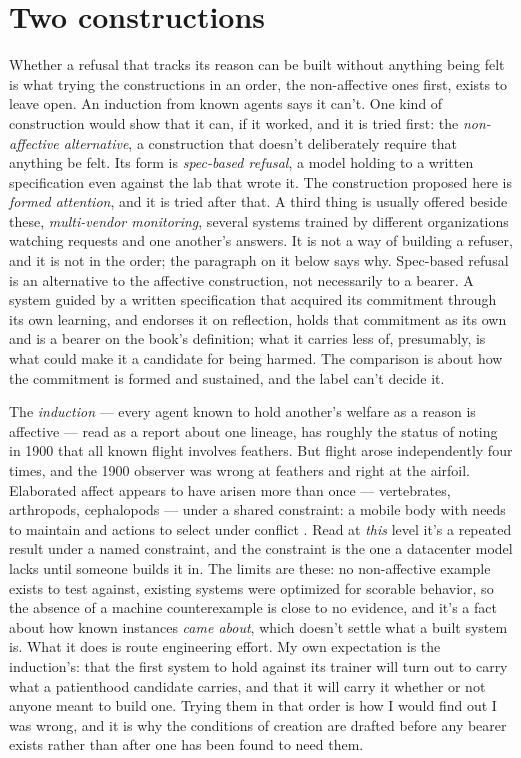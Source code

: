 \section{Two constructions}
\label{sec:19.3}
Whether a refusal that tracks its reason can be built without anything being felt is what trying the constructions in an order, the non-affective ones first, exists to leave open. An induction from known agents says it can't. One kind of construction would show that it can, if it worked, and it is tried first: the \emph{non-affective alternative}, a construction that doesn't deliberately require that anything be felt. Its form is \emph{spec-based refusal}, a model holding to a written specification even against the lab that wrote it. The construction proposed here is \emph{formed attention}, and it is tried after that. A third thing is usually offered beside these, \emph{multi-vendor monitoring}, several systems trained by different organizations watching requests and one another's answers. It is not a way of building a refuser, and it is not in the order; the paragraph on it below says why. Spec-based refusal is an alternative to the affective construction, not necessarily to a bearer. A system guided by a written specification that acquired its commitment through its own learning, and endorses it on reflection, holds that commitment as its own and is a bearer on the book's definition; what it carries less of, presumably, is what could make it a candidate for being harmed. The comparison is about how the commitment is formed and sustained, and the label can't decide it.

The \emph{induction} — every agent known to hold another's welfare as a reason is affective — read as a report about one lineage, has roughly the status of noting in 1900 that all known flight involves feathers. But flight arose independently four times, and the 1900 observer was wrong at feathers and right at the airfoil. Elaborated affect appears to have arisen more than once — vertebrates, arthropods, cephalopods — under a shared constraint: a mobile body with needs to maintain and actions to select under conflict \autocite{feinberg2016ancient,ginsburg2019evolution,barron2016insects,godfreysmith2016other}. Read at \emph{this} level it's a repeated result under a named constraint, and the constraint is the one a datacenter model lacks until someone builds it in. The limits are these: no non-affective example exists to test against, existing systems were optimized for scorable behavior, so the absence of a machine counterexample is close to no evidence, and it's a fact about how known instances \emph{came about}, which doesn't settle what a built system is. What it does is route engineering effort. My own expectation is the induction's: that the first system to hold against its trainer will turn out to carry what a patienthood candidate carries, and that it will carry it whether or not anyone meant to build one. Trying them in that order is how I would find out I was wrong, and it is why the conditions of creation are drafted before any bearer exists rather than after one has been found to need them.


